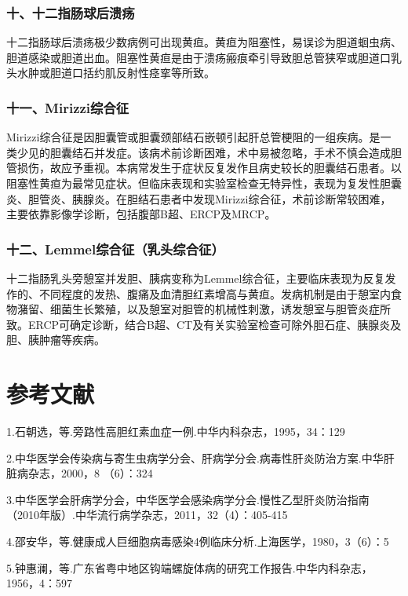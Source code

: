 \subsubsection{十、十二指肠球后溃疡}

十二指肠球后溃疡极少数病例可出现黄疸。黄疸为阻塞性，易误诊为胆道蛔虫病、胆道感染或胆道出血。阻塞性黄疸是由于溃疡瘢痕牵引导致胆总管狭窄或胆道口乳头水肿或胆道口括约肌反射性痉挛等所致。

\subsubsection{十一、Mirizzi综合征}

Mirizzi综合征是因胆囊管或胆囊颈部结石嵌顿引起肝总管梗阻的一组疾病。是一类少见的胆囊结石并发症。该病术前诊断困难，术中易被忽略，手术不慎会造成胆管损伤，故应予重视。本病常发生于症状反复发作且病史较长的胆囊结石患者。以阻塞性黄疸为最常见症状。但临床表现和实验室检查无特异性，表现为复发性胆囊炎、胆管炎、胰腺炎。在胆结石患者中发现Mirizzi综合征，术前诊断常较困难，主要依靠影像学诊断，包括腹部B超、ERCP及MRCP。

\subsubsection{十二、Lemmel综合征（乳头综合征）}

十二指肠乳头旁憩室并发胆、胰病变称为Lemmel综合征，主要临床表现为反复发作的、不同程度的发热、腹痛及血清胆红素增高与黄疸。发病机制是由于憩室内食物潴留、细菌生长繁殖，以及憩室对胆管的机械性刺激，诱发憩室与胆管炎症所致。ERCP可确定诊断，结合B超、CT及有关实验室检查可除外胆石症、胰腺炎及胆、胰肿瘤等疾病。

\protect\hypertarget{text00218.html}{}{}

\section{参考文献}

1.石朝选，等.旁路性高胆红素血症一例.中华内科杂志，1995，34：129

2.中华医学会传染病与寄生虫病学分会、肝病学分会.病毒性肝炎防治方案.中华肝脏病杂志，2000，8
（6）：324

3.中华医学会肝病学分会，中华医学会感染病学分会.慢性乙型肝炎防治指南（2010年版）.中华流行病学杂志，2011，32（4）：405-415

4.邵安华，等.健康成人巨细胞病毒感染4例临床分析.上海医学，1980，3（6）：5

5.钟惠澜，等.广东省粤中地区钩端螺旋体病的研究工作报告.中华内科杂志，1956，4：597

